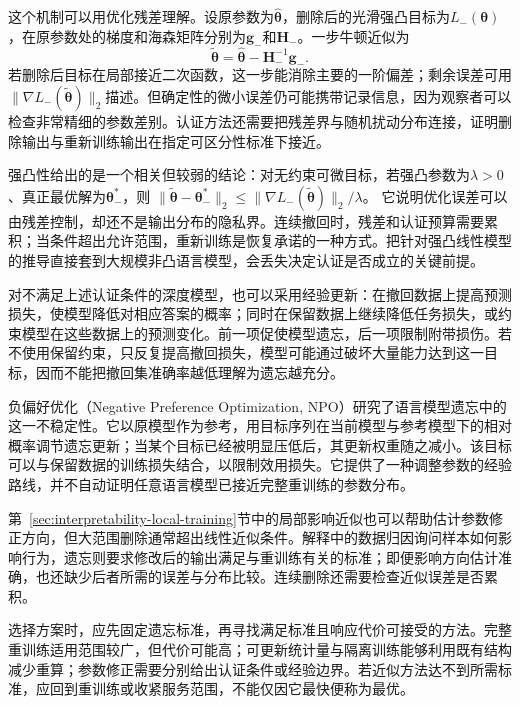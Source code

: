 这个机制可以用优化残差理解。设原参数为$\hat{\bm\theta}$，删除后的光滑强凸目标为$L_-(\bm\theta)$，在原参数处的梯度和海森矩阵分别为$\bm g_-$和$\bm H_-$。一步牛顿近似为
\begin{equation}
 \tilde{\bm\theta}
 =\hat{\bm\theta}-\bm H_-^{-1}\bm g_-.
 \label{eq:privacy-newton-removal}
\end{equation}
若删除后目标在局部接近二次函数，这一步能消除主要的一阶偏差；剩余误差可用$\lVert\nabla L_-(\tilde{\bm\theta})\rVert_2$描述。但确定性的微小误差仍可能携带记录信息，因为观察者可以检查非常精细的参数差别。认证方法还需要把残差界与随机扰动分布连接，证明删除输出与重新训练输出在指定可区分性标准下接近。

强凸性给出的是一个相关但较弱的结论：对无约束可微目标，若强凸参数为$\lambda>0$、真正最优解为$\bm\theta_-^*$，则
$\lVert\tilde{\bm\theta}-\bm\theta_-^*\rVert_2
\leq\lVert\nabla L_-(\tilde{\bm\theta})\rVert_2/\lambda$。
它说明优化误差可以由残差控制，却还不是输出分布的隐私界。连续撤回时，残差和认证预算需要累积；当条件超出允许范围，重新训练是恢复承诺的一种方式。把针对强凸线性模型的推导直接套到大规模非凸语言模型，会丢失决定认证是否成立的关键前提。

对不满足上述认证条件的深度模型，也可以采用经验更新：在撤回数据上提高预测损失，使模型降低对相应答案的概率；同时在保留数据上继续降低任务损失，或约束模型在这些数据上的预测变化。前一项促使模型遗忘，后一项限制附带损伤。若不使用保留约束，只反复提高撤回损失，模型可能通过破坏大量能力达到这一目标，因而不能把撤回集准确率越低理解为遗忘越充分。

负偏好优化（Negative Preference Optimization, NPO）研究了语言模型遗忘中的这一不稳定性。它以原模型作为参考，用目标序列在当前模型与参考模型下的相对概率调节遗忘更新；当某个目标已经被明显压低后，其更新权重随之减小。该目标可以与保留数据的训练损失结合，以限制效用损失。它提供了一种调整参数的经验路线，并不自动证明任意语言模型已接近完整重训练的参数分布。

第~\ref{sec:interpretability-local-training}节中的局部影响近似也可以帮助估计参数修正方向，但大范围删除通常超出线性近似条件。解释中的数据归因询问样本如何影响行为，遗忘则要求修改后的输出满足与重训练有关的标准；即便影响方向估计准确，也还缺少后者所需的误差与分布比较。连续删除还需要检查近似误差是否累积。

选择方案时，应先固定遗忘标准，再寻找满足标准且响应代价可接受的方法。完整重训练适用范围较广，但代价可能高；可更新统计量与隔离训练能够利用既有结构减少重算；参数修正需要分别给出认证条件或经验边界。若近似方法达不到所需标准，应回到重训练或收紧服务范围，不能仅因它最快便称为最优。

